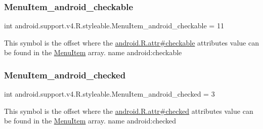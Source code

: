 \subsubsection{\texorpdfstring{Menu\+Item\+\_\+android\+\_\+checkable}{MenuItem\_android\_checkable}}
{\footnotesize\ttfamily int android.\+support.\+v4.\+R.\+styleable.\+Menu\+Item\+\_\+android\+\_\+checkable = 11\hspace{0.3cm}{\ttfamily [static]}}

This symbol is the offset where the \hyperlink{}{android.\+R.\+attr\#checkable} attribute\textquotesingle{}s value can be found in the \hyperlink{classandroid_1_1support_1_1v4_1_1R_1_1styleable_a4234e016636b99c0c3d9cfc512903697}{Menu\+Item} array.  name android\+:checkable \mbox{\label{classandroid_1_1support_1_1v4_1_1R_1_1styleable_ade997ec68b8ea842ccd85dcddfdaa360}} 
\subsubsection{\texorpdfstring{Menu\+Item\+\_\+android\+\_\+checked}{MenuItem\_android\_checked}}
{\footnotesize\ttfamily int android.\+support.\+v4.\+R.\+styleable.\+Menu\+Item\+\_\+android\+\_\+checked = 3\hspace{0.3cm}{\ttfamily [static]}}

This symbol is the offset where the \hyperlink{}{android.\+R.\+attr\#checked} attribute\textquotesingle{}s value can be found in the \hyperlink{classandroid_1_1support_1_1v4_1_1R_1_1styleable_a4234e016636b99c0c3d9cfc512903697}{Menu\+Item} array.  name android\+:checked \mbox{\label{classandroid_1_1support_1_1v4_1_1R_1_1styleable_aabc00563415e16b30ecedaf11d6d9eb7}} 
